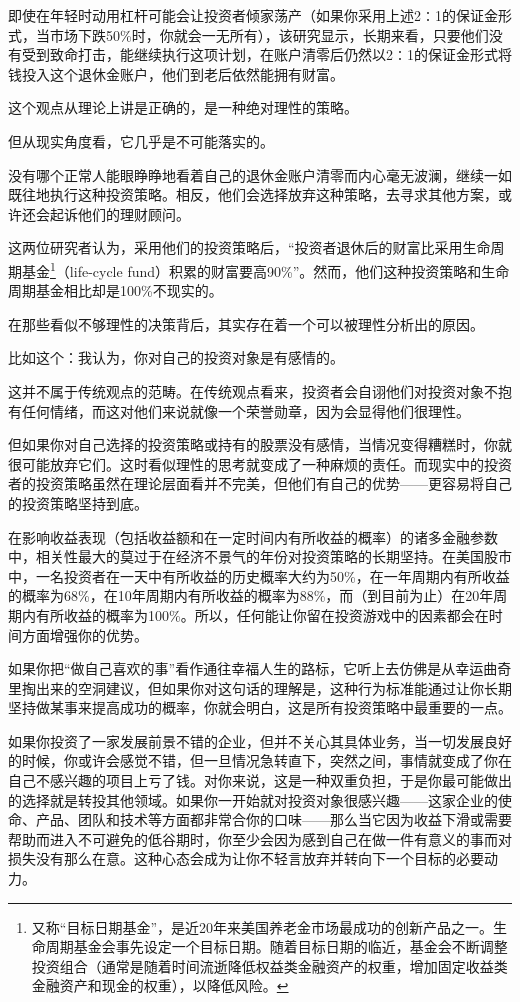 即使在年轻时动用杠杆可能会让投资者倾家荡产（如果你采用上述2∶1的保证金形式，当市场下跌50\%时，你就会一无所有），该研究显示，长期来看，只要他们没有受到致命打击，能继续执行这项计划，在账户清零后仍然以2∶1的保证金形式将钱投入这个退休金账户，他们到老后依然能拥有财富。

这个观点从理论上讲是正确的，是一种绝对理性的策略。

但从现实角度看，它几乎是不可能落实的。

没有哪个正常人能眼睁睁地看着自己的退休金账户清零而内心毫无波澜，继续一如既往地执行这种投资策略。相反，他们会选择放弃这种策略，去寻求其他方案，或许还会起诉他们的理财顾问。

这两位研究者认为，采用他们的投资策略后，“投资者退休后的财富比采用生命周期基金\footnote{又称“目标日期基金”，是近20年来美国养老金市场最成功的创新产品之一。生命周期基金会事先设定一个目标日期。随着目标日期的临近，基金会不断调整投资组合（通常是随着时间流逝降低权益类金融资产的权重，增加固定收益类金融资产和现金的权重），以降低风险。}（life-cycle fund）积累的财富要高90\%”。然而，他们这种投资策略和生命周期基金相比却是100\%不现实的。

在那些看似不够理性的决策背后，其实存在着一个可以被理性分析出的原因。

比如这个：我认为，你对自己的投资对象是有感情的。

这并不属于传统观点的范畴。在传统观点看来，投资者会自诩他们对投资对象不抱有任何情绪，而这对他们来说就像一个荣誉勋章，因为会显得他们很理性。

但如果你对自己选择的投资策略或持有的股票没有感情，当情况变得糟糕时，你就很可能放弃它们。这时看似理性的思考就变成了一种麻烦的责任。而现实中的投资者的投资策略虽然在理论层面看并不完美，但他们有自己的优势——更容易将自己的投资策略坚持到底。

在影响收益表现（包括收益额和在一定时间内有所收益的概率）的诸多金融参数中，相关性最大的莫过于在经济不景气的年份对投资策略的长期坚持。在美国股市中，一名投资者在一天中有所收益的历史概率大约为50\%，在一年周期内有所收益的概率为68\%，在10年周期内有所收益的概率为88\%，而（到目前为止）在20年周期内有所收益的概率为100\%。所以，任何能让你留在投资游戏中的因素都会在时间方面增强你的优势。

如果你把“做自己喜欢的事”看作通往幸福人生的路标，它听上去仿佛是从幸运曲奇里掏出来的空洞建议，但如果你对这句话的理解是，这种行为标准能通过让你长期坚持做某事来提高成功的概率，你就会明白，这是所有投资策略中最重要的一点。

如果你投资了一家发展前景不错的企业，但并不关心其具体业务，当一切发展良好的时候，你或许会感觉不错，但一旦情况急转直下，突然之间，事情就变成了你在自己不感兴趣的项目上亏了钱。对你来说，这是一种双重负担，于是你最可能做出的选择就是转投其他领域。如果你一开始就对投资对象很感兴趣——这家企业的使命、产品、团队和技术等方面都非常合你的口味——那么当它因为收益下滑或需要帮助而进入不可避免的低谷期时，你至少会因为感到自己在做一件有意义的事而对损失没有那么在意。这种心态会成为让你不轻言放弃并转向下一个目标的必要动力。

